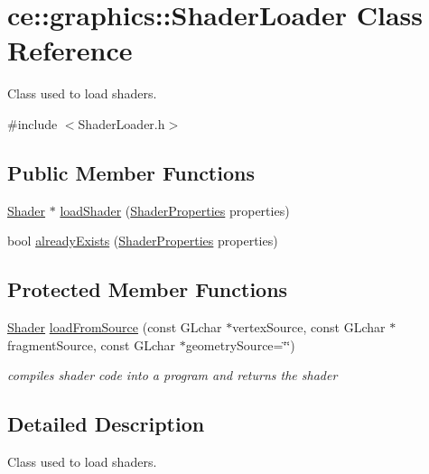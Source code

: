 \hypertarget{classce_1_1graphics_1_1_shader_loader}{}\section{ce\+:\+:graphics\+:\+:Shader\+Loader Class Reference}
\label{classce_1_1graphics_1_1_shader_loader}


Class used to load shaders.  




{\ttfamily \#include $<$Shader\+Loader.\+h$>$}

\subsection*{Public Member Functions}
\begin{DoxyCompactItemize}
\item 
\hyperlink{classce_1_1graphics_1_1_shader}{Shader} $\ast$ \hyperlink{classce_1_1graphics_1_1_shader_loader_a18279dc40df8efffce0b3d5227bd6af1}{load\+Shader} (\hyperlink{structce_1_1graphics_1_1_shader_properties}{Shader\+Properties} properties)
\item 
bool \hyperlink{classce_1_1graphics_1_1_shader_loader_ae01c71a34d77e36b5aafc142214c6595}{already\+Exists} (\hyperlink{structce_1_1graphics_1_1_shader_properties}{Shader\+Properties} properties)
\end{DoxyCompactItemize}
\subsection*{Protected Member Functions}
\begin{DoxyCompactItemize}
\item 
\hyperlink{classce_1_1graphics_1_1_shader}{Shader} \hyperlink{classce_1_1graphics_1_1_shader_loader_a310a1f7e9478516bc85d03c4a08e6b21}{load\+From\+Source} (const G\+Lchar $\ast$vertex\+Source, const G\+Lchar $\ast$fragment\+Source, const G\+Lchar $\ast$geometry\+Source=\char`\"{}\char`\"{})
\begin{DoxyCompactList}\small\item\em compiles shader code into a program and returns the shader \end{DoxyCompactList}\end{DoxyCompactItemize}


\subsection{Detailed Description}
Class used to load shaders. 

